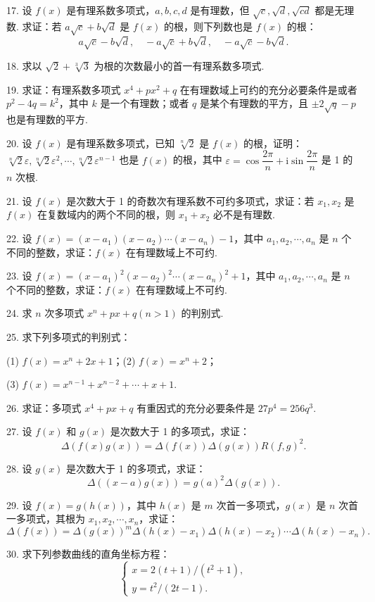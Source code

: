 \documentclass[UTF8, 12pt, fontset=fandol, oneside]{ctexart}
\begin{document}
17. 设 $f(x)$ 是有理系数多项式，$a,b,c,d$ 是有理数，但 $\sqrt c,\sqrt d,\sqrt{cd}$ 都是无理数. 求证：若 $a\sqrt c+b\sqrt d$ 是 $f(x)$ 的根，则下列数也是 $f(x)$ 的根：
\[
a\sqrt c-b\sqrt d,\quad -a\sqrt c+b\sqrt d,\quad -a\sqrt c-b\sqrt d.
\]

18. 求以 $\sqrt2+\sqrt[3]{3}$ 为根的次数最小的首一有理系数多项式.

19. 求证：有理系数多项式 $x^4+px^2+q$ 在有理数域上可约的充分必要条件是或者 $p^2-4q=k^2$，其中 $k$ 是一个有理数；或者 $q$ 是某个有理数的平方，且 $\pm2\sqrt q-p$ 也是有理数的平方.

20. 设 $f(x)$ 是有理系数多项式，已知 $\sqrt[n]{2}$ 是 $f(x)$ 的根，证明：$\sqrt[n]{2}\varepsilon,\sqrt[n]{2}\varepsilon^2,\cdots,\sqrt[n]{2}\varepsilon^{n-1}$ 也是 $f(x)$ 的根，其中 $\varepsilon=\cos\dfrac{2\pi}{n}+\mathrm{i}\sin\dfrac{2\pi}{n}$ 是 1 的 $n$ 次根.

21. 设 $f(x)$ 是次数大于 1 的奇数次有理系数不可约多项式，求证：若 $x_1,x_2$ 是 $f(x)$ 在复数域内的两个不同的根，则 $x_1+x_2$ 必不是有理数.

22. 设 $f(x)=(x-a_1)(x-a_2)\cdots(x-a_n)-1$，其中 $a_1,a_2,\cdots,a_n$ 是 $n$ 个不同的整数，求证：$f(x)$ 在有理数域上不可约.

23. 设 $f(x)=(x-a_1)^2(x-a_2)^2\cdots(x-a_n)^2+1$，其中 $a_1,a_2,\cdots,a_n$ 是 $n$ 个不同的整数，求证：$f(x)$ 在有理数域上不可约.

24. 求 $n$ 次多项式 $x^n+px+q(n>1)$ 的判别式.

25. 求下列多项式的判别式：

(1) $f(x)=x^n+2x+1$；\qquad (2) $f(x)=x^n+2$；

(3) $f(x)=x^{n-1}+x^{n-2}+\cdots+x+1$.

26. 求证：多项式 $x^4+px+q$ 有重因式的充分必要条件是 $27p^4=256q^3$.

27. 设 $f(x)$ 和 $g(x)$ 是次数大于 1 的多项式，求证：
\[
\Delta(f(x)g(x))=\Delta(f(x))\Delta(g(x))R(f,g)^2.
\]

28. 设 $g(x)$ 是次数大于 1 的多项式，求证：
\[
\Delta((x-a)g(x))=g(a)^2\Delta(g(x)).
\]

29. 设 $f(x)=g(h(x))$，其中 $h(x)$ 是 $m$ 次首一多项式，$g(x)$ 是 $n$ 次首一多项式，其根为 $x_1,x_2,\cdots,x_n$，求证：
\[
\Delta(f(x))=\Delta(g(x))^m\Delta(h(x)-x_1)\Delta(h(x)-x_2)\cdots\Delta(h(x)-x_n).
\]

30. 求下列参数曲线的直角坐标方程：
\[
\begin{cases}
x=2(t+1)/(t^2+1),\\
y=t^2/(2t-1).
\end{cases}
\]
\end{document}
